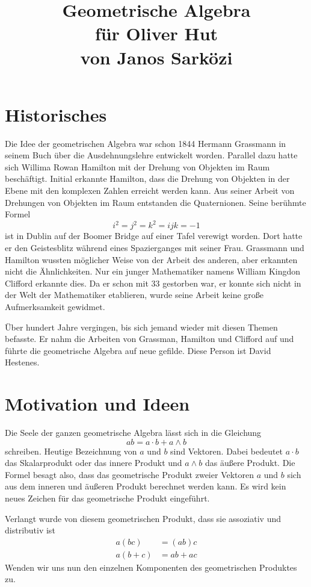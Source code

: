 \documentclass[11pt, a4paper, fleqn]{report}
\title{Geometrische Algebra \\
für Oliver Hut \\
von Janos Sarközi}
\numberwithin{equation}{section}
\begin{document}
\maketitle
\section{Historisches}
Die Idee der geometrischen Algebra war schon 1844 Hermann Grassmann in seinem
Buch über die Ausdehnungslehre entwickelt worden. Parallel dazu hatte sich
Willima Rowan Hamilton mit der Drehung von Objekten im Raum beschäftigt.
Initial erkannte Hamilton, dass die Drehung von Objekten in der Ebene mit den
komplexen Zahlen erreicht werden kann. Aus seiner Arbeit von Drehungen von
Objekten im Raum entstanden die Quaternionen. Seine berühmte Formel
\[i^2=j^2=k^2=ijk=-1\]
ist in Dublin auf der Boomer Bridge auf einer Tafel verewigt worden. Dort
hatte er den Geistesblitz während eines Spazierganges mit seiner Frau.
Grassmann und Hamilton wussten möglicher Weise von der Arbeit des anderen,
aber erkannten nicht die Ähnlichkeiten. Nur ein junger Mathematiker namens
William Kingdon Clifford erkannte dies. Da er schon mit 33 gestorben war,
er konnte sich nicht in der Welt der Mathematiker etablieren, wurde seine
Arbeit keine große Aufmerksamkeit gewidmet.

Über hundert Jahre vergingen, bis sich jemand wieder mit diesen Themen
befasste. Er nahm die Arbeiten von Grassman, Hamilton und Clifford auf und
führte die geometrische Algebra auf neue gefilde. Diese Person ist David
Hestenes.

\section{Motivation und Ideen}
Die Seele der ganzen geometrische Algebra lässt sich in die
Gleichung
\[ab = a\cdot b + a\wedge b\]
schreiben. Heutige Bezeichnung von $a$ und $b$ sind Vektoren. Dabei bedeutet
$a\cdot b$ das Skalarprodukt oder das innere Produkt und $a\wedge b$ das
äußere Produkt. Die Formel besagt also, dass das geometrische Produkt zweier
Vektoren $a$ und $b$ sich aus dem inneren und äußeren Produkt berechnet
werden kann. Es wird kein neues Zeichen für das geometrische Produkt
eingeführt.

Verlangt wurde von diesem geometrischen Produkt, dass sie assoziativ und 
distributiv ist
\begin{align*}
    a(bc) &= (ab)c \\
    a(b+c) &= ab + ac
\end{align*}
\newpage
Wenden wir uns nun den einzelnen Komponenten des geometrischen Produktes zu.
\end{document}
